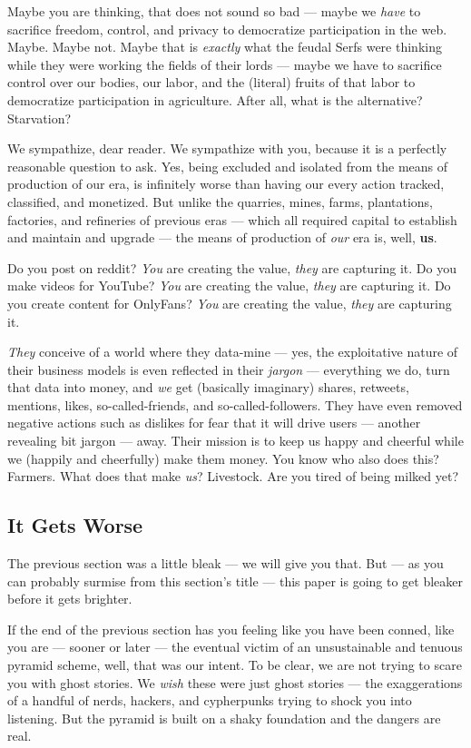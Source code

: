 \documentclass[a4paper]{article}
\begin{document}
Maybe you are thinking, that does not sound so bad ---  maybe we \emph{have} to sacrifice freedom, control, and privacy to democratize participation in the web. Maybe. Maybe not. Maybe that is \emph{exactly} what the feudal Serfs were thinking while they were working the fields of their lords ---  maybe we have to sacrifice control over our bodies, our labor, and the (literal) fruits of that labor to democratize participation in agriculture. After all, what is the alternative? Starvation?

We sympathize, dear reader. We sympathize with you, because it is a perfectly reasonable question to ask. Yes, being excluded and isolated from the means of production of our era, is infinitely worse than having our every action tracked, classified, and monetized. But unlike the quarries, mines, farms, plantations, factories, and refineries of previous eras ---  which all required capital to establish and maintain and upgrade ---  the means of production of \emph{our} era is, well, \textbf{us}.

Do you post on reddit? \emph{You} are creating the value, \emph{they} are capturing it. Do you make videos for YouTube? \emph{You} are creating the value, \emph{they} are capturing it. Do you create content for OnlyFans? \emph{You} are creating the value, \emph{they} are capturing it.

 \emph{They} conceive of a world where they data-mine ---  yes, the exploitative nature of their business models is even reflected in their \emph{jargon} ---  everything we do, turn that data into money, and \emph{we} get (basically imaginary) shares, retweets, mentions, likes, so-called-friends, and so-called-followers. They have even removed negative actions such as dislikes for fear that it will drive users ---  another revealing bit jargon ---  away. Their mission is to keep us happy and cheerful while we (happily and cheerfully) make them money. You know who also does this? Farmers. What does that make \emph{us}? Livestock. Are you tired of being milked yet?
\subsection{It Gets Worse}
\label{It Gets Worse}

The previous section was a little bleak ---  we will give you that. But ---  as you can probably surmise from this section's title ---  this paper is going to get bleaker before it gets brighter.

If the end of the previous section has you feeling like you have been conned, like you are ---  sooner or later ---  the eventual victim of an unsustainable and tenuous pyramid scheme, well, that was our intent. To be clear, we are not trying to scare you with ghost stories. We \emph{wish} these were just ghost stories ---  the exaggerations of a handful of nerds, hackers, and cypherpunks trying to shock you into listening. But the pyramid is built on a shaky foundation and the dangers are real.
\end{document}
